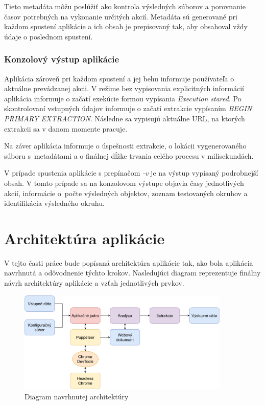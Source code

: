 \bigskip

Tieto metadáta môžu poslúžiť ako kontrola výsledných súborov a porovnanie časov potrebných na vykonanie určitých akcií. Metadáta sú generované pri každom spustení aplikácie a ich obsah je prepisovaný tak, aby obsahoval vždy údaje o poslednom spustení.


\subsubsection{Konzolový výstup aplikácie}

Aplikácia zároveň pri každom spustení a jej behu informuje používateľa o aktuálne prevádzanej akcii. V režime bez vypisovania explicitných informácií aplikácia informuje o začatí exekúcie formou vypísania \textit{Execution stared}.  Po skontrolovaní vstupných údajov informuje o začatí extrakcie vypísaním \textit{BEGIN PRIMARY EXTRACTION}. Následne sa vypisujú aktuálne URL, na ktorých extrakcii sa v danom momente pracuje. 

Na záver aplikácia informuje o úspešnosti extrakcie, o lokácii vygenerovaného súboru s~metadátami a o finálnej dĺžke trvania celého procesu v milisekundách.

V prípade spustenia aplikácie s prepínačom \textit{-v} je na výstup vypísaný podrobnejší obsah. V tomto prípade sa na konzolovom výstupe objavia časy jednotlivých akcií, informácie o~počte výsledných objektov, zoznam testovaných okruhov a identifikácia výsledného okruhu.

\section{Architektúra aplikácie}

V tejto časti práce bude popísaná architektúra aplikácie tak, ako bola aplikácia navrhnutá a odôvodnenie týchto krokov. Nasledujúci diagram reprezentuje finálny návrh architektúry aplikácie a vzťah jednotlivých prvkov.

\bigskip

\begin{figure}[hbt]
	\centering
	\includegraphics[width=0.9\textwidth]{obrazky-figures/architecture.pdf}
	\caption{Diagram navrhnutej architektúry}
	\label{architecture}
\end{figure}

